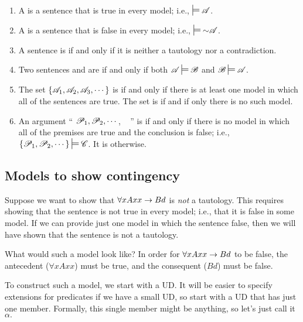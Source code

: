 \begin{enumerate}
\item A  is a sentence  that is true in every model; i.e.,  $\sdtstile{}{} \script{A}$.

\item A  is a sentence  that is false in every model; i.e., $\sdtstile{}{} \enot\script{A}$.

\item A sentence is  if and only if it is neither a tautology nor a contradiction.

\item Two sentences  and  are  if and only if both $\script{A}\sdtstile{}{}\script{B}$ and $\script{B}\sdtstile{}{}\script{A}$.

\item The set $\{\mathscr{A}_1,\mathscr{A}_2,\mathscr{A}_3,\cdots\}$ is  if and only if there is at least one model in which all of the sentences are true. The set is  if and if only there is no such model.

\item An argument `` $\mathscr{P}_1, \mathscr{P}_2, \cdots$, \therefore\  '' is  if and only if there is no model in which all of the premises are true and the conclusion is false; i.e., $\{\script{P}_1,\script{P}_2,\cdots\}\sdtstile{}{}\script{C}$. It is  otherwise.
\end{enumerate}


\subsection{Models to show contingency}

Suppose we want to show that $\forall xAxx \rightarrow Bd$ is \emph{not} a tautology. This requires showing that the sentence is not true in every model; i.e., that it is false in some model. If we can provide just one model in which the sentence false, then we will have shown that the sentence is not a tautology.

What would such a model look like? In order for $\forall xAxx \rightarrow Bd$ to be false, the antecedent ($\forall x Axx$) must be true, and the consequent ($Bd$) must be false.

To construct such a model, we start with a UD. It will be easier to specify extensions for predicates if we have a small UD, so start with a UD that has just one member. Formally, this single member might be anything, so let's just call it $\alpha.$ 

